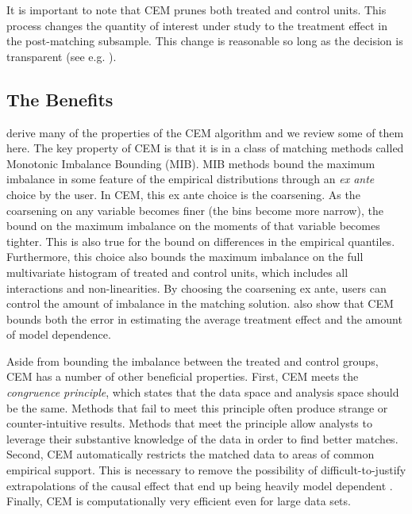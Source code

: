 \documentclass[11pt]{article}
\begin{document}
It is important to note that CEM prunes both treated and control
units.  This process changes the quantity of interest under study to
the treatment effect in the post-matching subsample. This change is
reasonable so long as the decision is transparent (see e.g.
\citet{CruHotImb06}).

\subsection{The Benefits}
\citet{IacKinPor11c} derive many of the properties of the CEM algorithm and
we review some of them here. The key property of CEM is that it is in a
class of matching methods called Monotonic Imbalance Bounding (MIB). MIB
methods bound the maximum imbalance in some feature of the empirical
distributions through an \emph{ex ante} choice by the user. In CEM, this
ex ante choice is the coarsening. As the coarsening on any variable
becomes finer (the bins become more narrow), the bound on the maximum
imbalance on the moments of that variable becomes tighter. This is also
true for the bound on differences in the empirical quantiles.
Furthermore, this choice also bounds the maximum imbalance on the full
multivariate histogram of treated and control units, which includes all
interactions and non-linearities. By choosing the coarsening ex ante,
users can control the amount of imbalance in the matching solution.
\citet{IacKinPor11c} also show that CEM bounds both the error in estimating the
average treatment effect and the amount of model dependence.

Aside from bounding the imbalance between the treated and control groups,
CEM has a number of other beneficial properties. First, CEM meets the
\emph{congruence principle}, which states that the data space and analysis
space should be the same. Methods that fail to meet this principle often
produce strange or counter-intuitive results. Methods that meet the
principle allow analysts to leverage their substantive knowledge of the
data in order to find better matches. Second, CEM automatically restricts
the matched data to areas of common empirical support. This is necessary to
remove the possibility of difficult-to-justify extrapolations of the
causal effect that end up being heavily model dependent
\citep{KinZen06}. Finally, CEM is computationally very efficient even
for large data sets.
\end{document}
